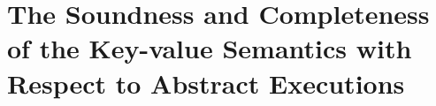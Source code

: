 \section{The Soundness and Completeness of the Key-value Semantics with Respect to Abstract Executions}
\label{sec:kv-sound-complete-proof}




